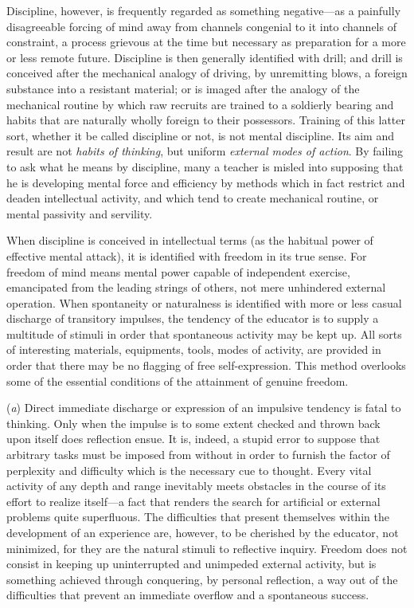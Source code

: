 \documentclass[showtrims,ustradepaper]{memoir}
\begin{document}

Discipline, however, is frequently regarded as something negative---as a
painfully disagreeable forcing of mind away from channels congenial to
it into channels of constraint, a process grievous at the time but
necessary as preparation for a more or less remote future. Discipline is
then generally identified with drill; and drill is conceived after the
mechanical analogy of driving, by unremitting blows, a foreign substance
into a resistant material; or is imaged after the analogy of the
mechanical routine by which raw recruits are trained to a soldierly
bearing and habits that are naturally wholly foreign to their
possessors. Training of this latter sort, whether it be called
discipline or not, is not mental discipline. Its aim and result are not
\emph{habits of thinking}, but uniform \emph{external modes of action}.
By failing to ask what he means by discipline, many a teacher is misled
into supposing that he is
developing
mental force and efficiency by methods which in fact restrict and deaden
intellectual activity, and which tend to create mechanical routine, or
mental passivity and servility.



When discipline is conceived in intellectual terms (as the habitual
power of effective mental attack), it is identified with freedom in its
true sense. For freedom of mind means mental power capable of
independent exercise, emancipated from the leading strings of others,
not mere unhindered external operation. When spontaneity or naturalness
is identified with more or less casual discharge of transitory impulses,
the tendency of the educator is to supply a multitude of stimuli in
order that spontaneous activity may be kept up. All sorts of interesting
materials, equipments, tools, modes of activity, are provided in order
that there may be no flagging of free self-expression. This method
overlooks some of the essential conditions of the attainment of genuine
freedom.


(\emph{a}) Direct immediate discharge or expression of an impulsive
tendency is fatal to thinking. Only when the impulse is to some extent
checked and thrown back upon itself does reflection ensue. It is,
indeed, a stupid error to suppose that arbitrary tasks must be imposed
from without in order to furnish the factor of perplexity and difficulty
which is the necessary cue to thought. Every vital activity of any depth
and range inevitably meets obstacles in the course of its effort to
realize itself---a fact that renders the search for artificial or
external problems quite superfluous. The difficulties that present
themselves within the development of an experience are, however, to be
cherished by the educator, not minimized, for they are the natural
stimuli
to reflective inquiry. Freedom does not consist in keeping up
uninterrupted and unimpeded external activity, but is something achieved
through conquering, by personal reflection, a way out of the
difficulties that prevent an immediate overflow and a spontaneous
success.
\end{document}
